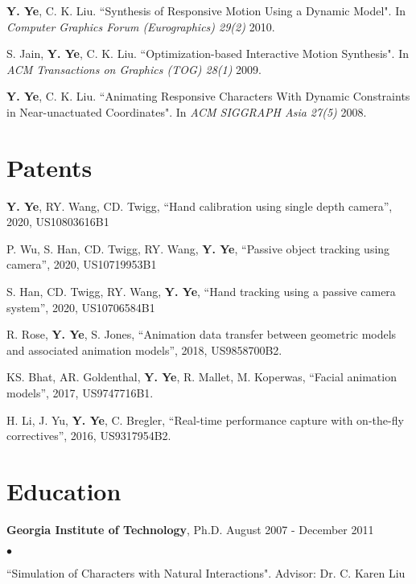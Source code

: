 \documentclass[margin,line]{res}
\newenvironment{list2}{
  \begin{list}{$\bullet$}{%
      \setlength{\itemsep}{0in}
      \setlength{\parsep}{0in} \setlength{\parskip}{0in}
      \setlength{\topsep}{0in} \setlength{\partopsep}{0in} 
      \setlength{\leftmargin}{0.2in}}}{\end{list}}
\begin{document}
\begin{resume}
\vspace*{-.1in}
{\bf Y. Ye}, C. K. Liu. ``Synthesis of Responsive Motion Using a Dynamic Model". In {\em Computer Graphics Forum (Eurographics) 29(2)} 2010.

\vspace*{-.1in}
S. Jain, {\bf Y. Ye}, C. K. Liu. ``Optimization-based Interactive Motion Synthesis". In {\em ACM Transactions on Graphics (TOG) 28(1)} 2009. 

\vspace*{-.1in}
{\bf Y. Ye}, C. K. Liu. ``Animating Responsive Characters With Dynamic Constraints in Near-unactuated Coordinates".  In {\em ACM SIGGRAPH Asia 27(5)} 2008.



\section{\sc Patents}

{\bf Y. Ye},  RY. Wang, CD. Twigg, ``Hand calibration using single depth camera'', 2020, US10803616B1

\vspace*{-.1in}
P. Wu, S. Han, CD. Twigg, RY. Wang, {\bf Y. Ye}, ``Passive object tracking using camera'', 2020, US10719953B1

\vspace*{-.1in}
S. Han, CD. Twigg, RY. Wang, {\bf Y. Ye}, ``Hand tracking using a passive camera system'', 2020, US10706584B1

\vspace*{-.1in}
R. Rose, {\bf Y. Ye}, S. Jones, ``Animation data transfer between geometric models and associated animation models'', 2018, US9858700B2. 

\vspace*{-.1in}
KS. Bhat, AR. Goldenthal, {\bf Y. Ye}, R. Mallet, M. Koperwas, ``Facial animation models'', 2017, US9747716B1.  

\vspace*{-.1in}
H. Li, J. Yu, {\bf Y. Ye}, C. Bregler, ``Real-time performance capture with on-the-fly correctives'', 2016, US9317954B2.


\section{\sc Education}
{\bf Georgia Institute of Technology}, Ph.D.  \hfill August 2007 - December 2011 \\
\begin{list2}
\vspace*{-.15in}
\item ``Simulation of Characters with Natural Interactions". Advisor:  Dr. C. Karen Liu
\end{list2}


\end{resume}
\end{document}
